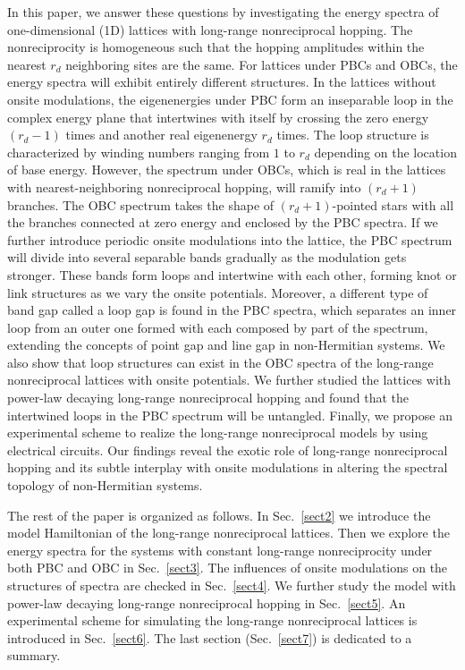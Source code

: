\documentclass[prb,aps,twocolumn,showpacs]{revtex4-2} %
\begin{document}
In this paper, we answer these questions by investigating the energy spectra of one-dimensional (1D) lattices with long-range nonreciprocal hopping. The nonreciprocity is homogeneous such that the hopping amplitudes within the nearest $r_d$ neighboring sites are the same. For lattices under PBCs and OBCs, the energy spectra will exhibit entirely different structures. In the lattices without onsite modulations, the eigenenergies under PBC form an inseparable loop in the complex energy plane that intertwines with itself by crossing the zero energy $(r_d-1)$ times and another real eigenenergy $r_d$ times. The loop structure is characterized by winding numbers ranging from $1$ to $r_d$ depending on the location of base energy. However, the spectrum under OBCs, which is real in the lattices with nearest-neighboring nonreciprocal hopping, will ramify into $(r_d+1)$ branches. The OBC spectrum takes the shape of $(r_d+1)$-pointed stars with all the branches connected at zero energy and enclosed by the PBC spectra. If we further introduce periodic onsite modulations into the lattice, the PBC spectrum will divide into several separable bands gradually as the modulation gets stronger. These bands form loops and intertwine with each other, forming knot or link structures as we vary the onsite potentials. Moreover, a different type of band gap called a loop gap is found in the PBC spectra, which separates an inner loop from an outer one formed with each composed by part of the spectrum, extending the concepts of point gap and line gap in non-Hermitian systems. We also show that loop structures can exist in the OBC spectra of the long-range nonreciprocal lattices with onsite potentials. We further studied the lattices with power-law decaying long-range nonreciprocal hopping and found that the intertwined loops in the PBC spectrum will be untangled. Finally, we propose an experimental scheme to realize the long-range nonreciprocal models by using electrical circuits. Our findings reveal the exotic role of long-range nonreciprocal hopping and its subtle interplay with onsite modulations in altering the spectral topology of non-Hermitian systems.

The rest of the paper is organized as follows. In Sec.~\ref{sect2} we introduce the model Hamiltonian of the long-range nonreciprocal lattices. Then we explore the energy spectra for the systems with constant long-range nonreciprocity under both PBC and OBC in Sec.~\ref{sect3}. The influences of onsite modulations on the structures of spectra are checked in Sec.~\ref{sect4}. We further study the model with power-law decaying long-range nonreciprocal hopping in Sec.~\ref{sect5}. An experimental scheme for simulating the long-range nonreciprocal lattices is introduced in Sec.~\ref{sect6}. The last section (Sec.~\ref{sect7}) is dedicated to a summary.
\end{document}
